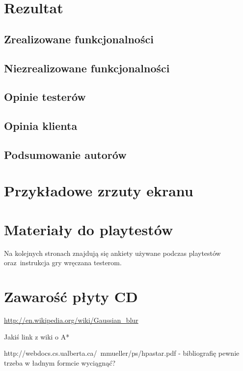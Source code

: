 \documentclass[licencjacka]{pracamgr}
\begin{document}
\chapter{Rezultat}

  \section{Zrealizowane funkcjonalności}

  \section{Niezrealizowane funkcjonalności}

  \section{Opinie testerów}

  \section{Opinia klienta}

  \section{Podsumowanie autorów}

\appendix

  \chapter{Przykładowe zrzuty ekranu}

  \chapter{Materiały do playtestów}
  Na kolejnych stronach znajdują się ankiety używane podczas playtestów
  oraz~instrukcja gry wręczana testerom.

    
    
    

  \chapter{Zawarość płyty CD}


\begin{thebibliography}{99}
  \item{\url{http://en.wikipedia.org/wiki/Gaussian_blur}}
  \item{Jakiś link z wiki o A*}
  \item{http://webdocs.cs.ualberta.ca/~mmueller/ps/hpastar.pdf - bibliografię pewnie trzeba w ładnym formcie wyciągnąć?}

\end{thebibliography}
\end{document}
